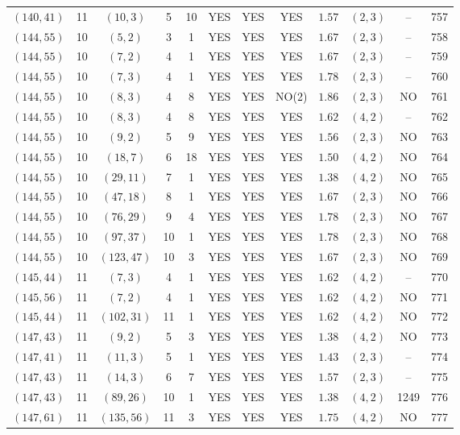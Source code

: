 \begin{longtable}{|c|c|c|c|c|c|c|c|c|c|c|c|}
$(140,41)$ & 11 & $(10,3)$ & 5 & 10 & YES & YES & YES & $1.57$ & $(2,3)$ & -- & 757\\
$(144,55)$ & 10 & $(5,2)$ & 3 & 1 & YES & YES & YES & $1.67$ & $(2,3)$ & -- & 758\\
$(144,55)$ & 10 & $(7,2)$ & 4 & 1 & YES & YES & YES & $1.67$ & $(2,3)$ & -- & 759\\
$(144,55)$ & 10 & $(7,3)$ & 4 & 1 & YES & YES & YES & $1.78$ & $(2,3)$ & -- & 760\\
$(144,55)$ & 10 & $(8,3)$ & 4 & 8 & YES & YES & NO(2) & $1.86$ & $(2,3)$ & NO & 761\\
$(144,55)$ & 10 & $(8,3)$ & 4 & 8 & YES & YES & YES & $1.62$ & $(4,2)$ & -- & 762\\
$(144,55)$ & 10 & $(9,2)$ & 5 & 9 & YES & YES & YES & $1.56$ & $(2,3)$ & NO & 763\\
$(144,55)$ & 10 & $(18,7)$ & 6 & 18 & YES & YES & YES & $1.50$ & $(4,2)$ & NO & 764\\
$(144,55)$ & 10 & $(29,11)$ & 7 & 1 & YES & YES & YES & $1.38$ & $(4,2)$ & NO & 765\\
$(144,55)$ & 10 & $(47,18)$ & 8 & 1 & YES & YES & YES & $1.67$ & $(2,3)$ & NO & 766\\
$(144,55)$ & 10 & $(76,29)$ & 9 & 4 & YES & YES & YES & $1.78$ & $(2,3)$ & NO & 767\\
$(144,55)$ & 10 & $(97,37)$ & 10 & 1 & YES & YES & YES & $1.78$ & $(2,3)$ & NO & 768\\
$(144,55)$ & 10 & $(123,47)$ & 10 & 3 & YES & YES & YES & $1.67$ & $(2,3)$ & NO & 769\\
$(145,44)$ & 11 & $(7,3)$ & 4 & 1 & YES & YES & YES & $1.62$ & $(4,2)$ & -- & 770\\
$(145,56)$ & 11 & $(7,2)$ & 4 & 1 & YES & YES & YES & $1.62$ & $(4,2)$ & NO & 771\\
$(145,44)$ & 11 & $(102,31)$ & 11 & 1 & YES & YES & YES & $1.62$ & $(4,2)$ & NO & 772\\
$(147,43)$ & 11 & $(9,2)$ & 5 & 3 & YES & YES & YES & $1.38$ & $(4,2)$ & NO & 773\\
$(147,41)$ & 11 & $(11,3)$ & 5 & 1 & YES & YES & YES & $1.43$ & $(2,3)$ & -- & 774\\
$(147,43)$ & 11 & $(14,3)$ & 6 & 7 & YES & YES & YES & $1.57$ & $(2,3)$ & -- & 775\\
$(147,43)$ & 11 & $(89,26)$ & 10 & 1 & YES & YES & YES & $1.38$ & $(4,2)$ & 1249 & 776\\
$(147,61)$ & 11 & $(135,56)$ & 11 & 3 & YES & YES & YES & $1.75$ & $(4,2)$ & NO & 777\\

\end{longtable}
